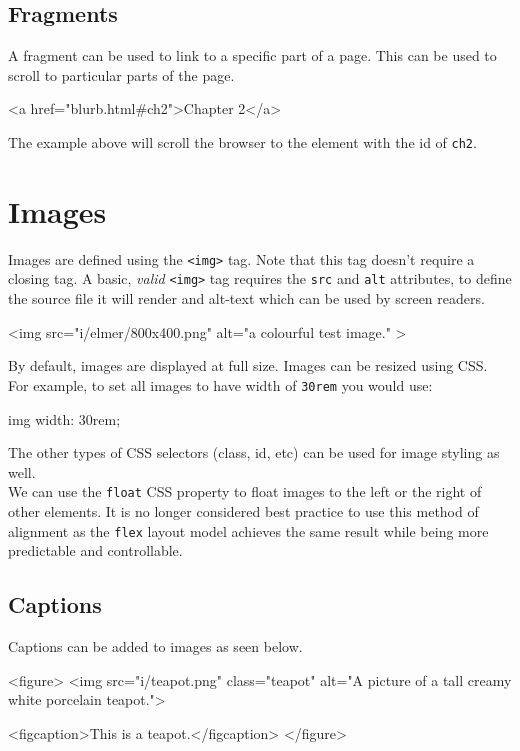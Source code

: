\subsection*{Fragments}
A fragment can be used to link to a specific part of a page. This can be used to scroll to particular parts of the page. 
\begin{html}
<a href="blurb.html#ch2">Chapter 2</a>
\end{html}
The example above will scroll the browser to the element with the id of \verb|ch2|. 


\section*{Images}
Images are defined using the \verb|<img>| tag. Note that this tag doesn't require a closing tag. A basic, \textit{valid} \verb|<img>| tag requires the \verb|src| and \verb|alt| attributes, to define the source file it will render and alt-text which can be used by screen readers.
\begin{html}
<img
  src="i/elmer/800x400.png"
  alt="a colourful test image."
>
\end{html}

By default, images are displayed at full size. Images can be resized using CSS. For example, to set all images to have width of \verb|30rem| you would use:
\begin{css}
img {
    width: 30rem;
}
\end{css}
The other types of CSS selectors (class, id, etc) can be used for image styling as well.\\

We can use the \verb|float| CSS property to float images to the left or the right of other elements. It is no longer considered best practice to use this method of alignment as the \verb|flex| layout model achieves the same result while being more predictable and controllable.
\subsection*{Captions}
Captions can be added to images as seen below.
\begin{html}
<figure>
  <img
    src="i/teapot.png"
    class="teapot"
    alt="A picture of a tall creamy white porcelain teapot.">

  <figcaption>This is a teapot.</figcaption>
</figure>
\end{html}
